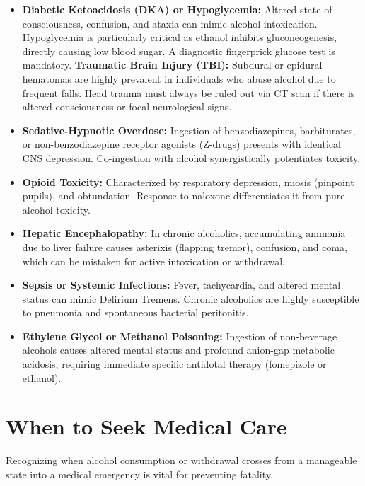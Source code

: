 \begin{itemize}
    \item \textbf{Diabetic Ketoacidosis (DKA) or Hypoglycemia:} Altered state of consciousness, confusion, and ataxia can mimic alcohol intoxication. Hypoglycemia is particularly critical as ethanol inhibits gluconeogenesis, directly causing low blood sugar. A diagnostic fingerprick glucose test is mandatory.
    \textbf{Traumatic Brain Injury (TBI):} Subdural or epidural hematomas are highly prevalent in individuals who abuse alcohol due to frequent falls. Head trauma must always be ruled out via CT scan if there is altered consciousness or focal neurological signs.
    \item \textbf{Sedative-Hypnotic Overdose:} Ingestion of benzodiazepines, barbiturates, or non-benzodiazepine receptor agonists (Z-drugs) presents with identical CNS depression. Co-ingestion with alcohol synergistically potentiates toxicity.
    \item \textbf{Opioid Toxicity:} Characterized by respiratory depression, miosis (pinpoint pupils), and obtundation. Response to naloxone differentiates it from pure alcohol toxicity.
    \item \textbf{Hepatic Encephalopathy:} In chronic alcoholics, accumulating ammonia due to liver failure causes asterixis (flapping tremor), confusion, and coma, which can be mistaken for active intoxication or withdrawal.
    \item \textbf{Sepsis or Systemic Infections:} Fever, tachycardia, and altered mental status can mimic Delirium Tremens. Chronic alcoholics are highly susceptible to pneumonia and spontaneous bacterial peritonitis.
    \item \textbf{Ethylene Glycol or Methanol Poisoning:} Ingestion of non-beverage alcohols causes altered mental status and profound anion-gap metabolic acidosis, requiring immediate specific antidotal therapy (fomepizole or ethanol).
\end{itemize}

\section*{When to Seek Medical Care}
Recognizing when alcohol consumption or withdrawal crosses from a manageable state into a medical emergency is vital for preventing fatality.

